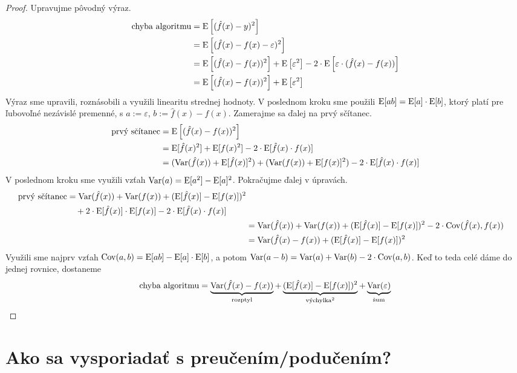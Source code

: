 \begin{proof}
  Upravujme pôvodný výraz.
  \begin{align}
    \chalg
      &= \E \left[ (\hat{f}(x) - y)^2 \right] \\
      &= \E \left[ (\hat{f}(x) - f(x) - \varepsilon)^2 \right] \\
      &= \E \left[ (\hat{f}(x) - f(x))^2 \right] + \E \left[ \varepsilon^2 \right] - 2 \cdot \E \left[ \varepsilon \cdot (\hat{f}(x) - f(x)) \right] \\
      &= \E \left[ (\hat{f}(x) - f(x))^2 \right] + \E \left[ \varepsilon^2 \right]
  \end{align}
  Výraz sme upravili, roznásobili a využili linearitu strednej hodnoty.
  V poslednom kroku sme použili $\E[ab] = \E[a] \cdot \E[b]$, ktorý
  platí pre ľubovoľné nezávislé premenné, s $a := \varepsilon$,
  $b := \hat{f}(x) - f(x)$. Zamerajme sa ďalej na prvý sčítanec.
  \begin{align}
    \text{prvý sčítanec}
      &= \E \left[ (\hat{f}(x) - f(x))^2 \right] \\
      &= \E[\hat{f}(x)^2] + \E[f(x)^2] - 2 \cdot \E[\hat{f}(x) \cdot f(x)] \\
      &= (\Var(\hat{f}(x)) + \E[\hat{f}(x)]^2) + (\Var(f(x)) + \E[f(x)]^2) - 2 \cdot \E[\hat{f}(x) \cdot f(x)]
  \end{align}
  V poslednom kroku sme využili vzťah $\Var(a) = \E[a^2] - \E[a]^2$.
  Pokračujme ďalej v úpravách.
  \begin{align}
    \begin{split}
      \text{prvý sčítanec}
        &= \Var(\hat{f}(x)) + \Var(f(x)) + (\E[\hat{f}(x)] - \E[f(x)])^2 \\
        &\quad + 2 \cdot \E[\hat{f}(x)] \cdot \E[f(x)] - 2 \cdot \E[\hat{f}(x) \cdot f(x)]
    \end{split} \\
    &= \Var(\hat{f}(x)) + \Var(f(x)) + (\E[\hat{f}(x)] - \E[f(x)])^2 - 2 \cdot \Cov(\hat{f}(x), f(x)) \\
    &= \Var(\hat{f}(x) - f(x)) + (\E[\hat{f}(x)] - \E[f(x)])^2
  \end{align}
  Využili sme najprv vzťah $\Cov(a, b) = \E[ab] - \E[a] \cdot \E[b]$,
  a potom $\Var(a - b) = \Var(a) + \Var(b) - 2 \cdot \Cov(a, b)$.
  Keď to teda celé dáme do jednej rovnice, dostaneme
  $$
  \chalg
      = \underbrace{\Var(\hat{f}(x) - f(x))}_{\text{\normalfont rozptyl}}
      + \underbrace{(\E[\hat{f}(x)] - \E[f(x)])^2}_{\text{\normalfont výchylka}^2}
      + \underbrace{\Var(\varepsilon)}_{\text{\normalfont šum}}
  $$
\end{proof}




\section{Ako sa vysporiadať s preučením/podučením?}

